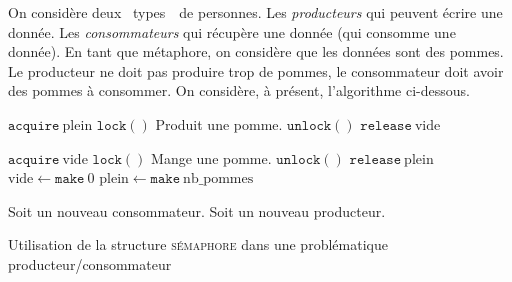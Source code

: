 \begin{exm}
	On considère deux \guillemotleft~types~\guillemotright\ de personnes. Les \textit{producteurs} qui peuvent écrire une donnée. Les \textit{consommateurs} qui récupère une donnée (qui consomme une donnée).
	En tant que métaphore, on considère que les données sont des pommes.
	Le producteur ne doit pas produire trop de pommes, le consommateur doit avoir des pommes à consommer.
	On considère, à présent, l'algorithme ci-dessous.

	\begin{algorithm}[H]
		\centering
		\begin{algorithmic}[1]
			\State $\texttt{acquire}\ \mathrm{plein}$
			\State $\texttt{lock}()$
			\State Produit une pomme.
			\State $\texttt{unlock}()$
			\State $\texttt{release}\ \mathrm{vide}$
			\EndProcedure
			\bigskip

			\State $\texttt{acquire}\ \mathrm{vide}$
			\State $\texttt{lock}()$
			\State Mange une pomme.
			\State $\texttt{unlock}()$
			\State $\texttt{release}\ \mathrm{plein}$
			\EndProcedure
			\bigskip
			\State $\mathrm{vide} \gets \texttt{make}\ 0$
			\State $\mathrm{plein} \gets \texttt{make}\ \mathrm{nb\_pommes}$

			\bigskip

			\State Soit un nouveau consommateur.
			\EndFor
			\State Soit un nouveau producteur.
			\EndFor
		\end{algorithmic}
		\caption{Utilisation de la structure \textsc{sémaphore} dans une problématique producteur/consommateur}
	\end{algorithm}
\end{exm}

